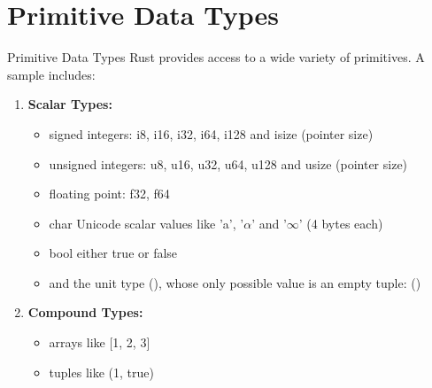\documentclass[10pt,xcolor={dvipsnames}, aspectratio=169]{beamer}
\begin{document}
\begin{frame}
\end{frame}

\section{Primitive Data Types}
	\begin{frame}{Primitive Data Types}
		Rust provides access to a wide variety of primitives. A sample includes:
		\begin{enumerate}
			\item \textbf{Scalar Types:}
				\begin{itemize}
					\item signed integers: i8, i16, i32, i64, i128 and isize (pointer size)
					\item unsigned integers: u8, u16, u32, u64, u128 and usize (pointer size)
					\item floating point: f32, f64
					\item char Unicode scalar values like 'a', '$\alpha$' and '$\infty$' (4 bytes each)
					\item bool either true or false
					\item and the unit type (), whose only possible value is an empty tuple: ()
				\end{itemize}
			\item \textbf{Compound Types:}
				\begin{itemize}
					\item arrays like [1, 2, 3]
					\item tuples like (1, true)
				\end{itemize}
		\end{enumerate}
	\end{frame}
\end{document}
